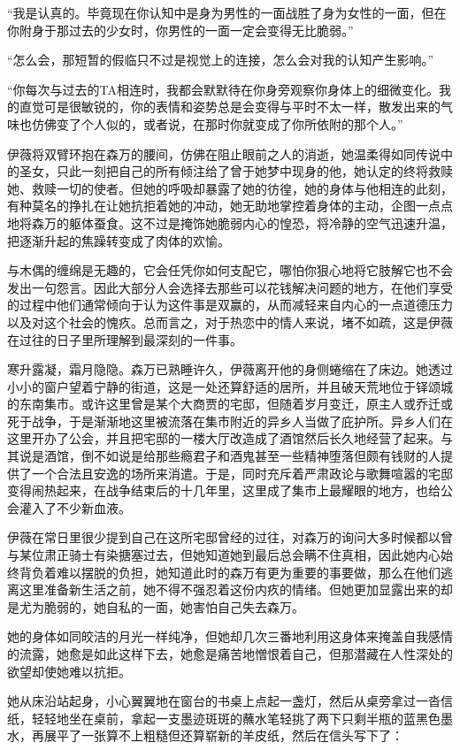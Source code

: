 “我是认真的。毕竟现在你认知中是身为男性的一面战胜了身为女性的一面，但在你附身于那过去的少女时，你男性的一面一定会变得无比脆弱。”

“怎么会，那短暂的假临只不过是视觉上的连接，怎么会对我的认知产生影响。”

“你每次与过去的TA相连时，我都会默默待在你身旁观察你身体上的细微变化。我的直觉可是很敏锐的，你的表情和姿势总是会变得与平时不太一样，散发出来的气味也仿佛变了个人似的，或者说，在那时你就变成了你所依附的那个人。”

伊薇将双臂环抱在森万的腰间，仿佛在阻止眼前之人的消逝，她温柔得如同传说中的圣女，只此一刻把自己的所有倾注给了曾于她梦中现身的他，她认定的终将救赎她、救赎一切的使者。但她的呼吸却暴露了她的彷徨，她的身体与他相连的此刻，有种莫名的挣扎在让她抗拒着她的冲动，她无助地掌控着身体的主动，企图一点点地将森万的躯体蚕食。这不过是掩饰她脆弱内心的惶恐，将冷静的空气迅速升温，把逐渐升起的焦躁转变成了肉体的欢愉。

与木偶的缠绵是无趣的，它会任凭你如何支配它，哪怕你狠心地将它肢解它也不会发出一句怨言。因此大部分人会选择去那些可以花钱解决问题的地方，在他们享受的过程中他们通常倾向于认为这件事是双赢的，从而减轻来自内心的一点道德压力以及对这个社会的愧疚。总而言之，对于热恋中的情人来说，堵不如疏，这是伊薇在过往的日子里所理解到最深刻的一件事。

寒升露凝，霜月隐隐。森万已熟睡许久，伊薇离开他的身侧蜷缩在了床边。她透过小小的窗户望着宁静的街道，这是一处还算舒适的居所，并且破天荒地位于铎颂城的东南集市。或许这里曾是某个大商贾的宅邸，但随着岁月变迁，原主人或乔迁或死于战争，于是渐渐地这里被流落在集市附近的异乡人当做了庇护所。异乡人们在这里开办了公会，并且把宅邸的一楼大厅改造成了酒馆然后长久地经营了起来。与其说是酒馆，倒不如说是给那些瘾君子和酒鬼甚至一些精神堕落但颇有钱财的人提供了一个合法且安逸的场所来消遣。于是，同时充斥着严肃政论与歌舞喧嚣的宅邸变得闹热起来，在战争结束后的十几年里，这里成了集市上最耀眼的地方，也给公会灌入了不少新血液。

伊薇在常日里很少提到自己在这所宅邸曾经的过往，对森万的询问大多时候都以曾与某位肃正骑士有染搪塞过去，但她知道她到最后总会瞒不住真相，因此她内心始终背负着难以摆脱的负担，她知道此时的森万有更为重要的事要做，那么在他们逃离这里准备新生活之前，她不得不强忍着这份内疚的情绪。但她更加显露出来的却是尤为脆弱的，她自私的一面，她害怕自己失去森万。

她的身体如同皎洁的月光一样纯净，但她却几次三番地利用这身体来掩盖自我感情的流露，她愈是如此这样下去，她愈是痛苦地憎恨着自己，但那潜藏在人性深处的欲望却使她难以抗拒。

她从床沿站起身，小心翼翼地在窗台的书桌上点起一盏灯，然后从桌旁拿过一沓信纸，轻轻地坐在桌前，拿起一支墨迹斑斑的蘸水笔轻挑了两下只剩半瓶的蓝黑色墨水，再展平了一张算不上粗糙但还算崭新的羊皮纸，然后在信头写下了：

